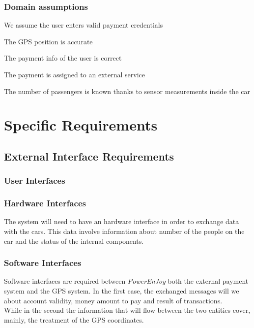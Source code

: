 \documentclass[11pt,a4paper]{report}
\begin{document}
\subsection{Domain assumptions}
\begin{DA}
	\item We assume the user enters valid payment credentials
	\item The GPS position is accurate
	\item The payment info of the user is correct
	\item The payment is assigned to an external service
	\item The number of passengers is known thanks to sensor measurements inside the car
\end{DA}
\chapter{Specific Requirements}
\section{External Interface Requirements}
\subsection{User Interfaces}
\subsection{Hardware Interfaces}
The system will need to have an hardware interface in order to exchange data with the cars. This data involve information about number of the people on the car and the status of the internal components.
\subsection{Software Interfaces}
Software interfaces are required between \textit{PowerEnJoy} both the external payment system and the GPS system.
In the first case, the exchanged messages will we about account validity, money amount to pay and result of transactions.\\
While in the second the information that will flow between the two entities cover, mainly, the treatment of the GPS coordinates.
\end{document}
